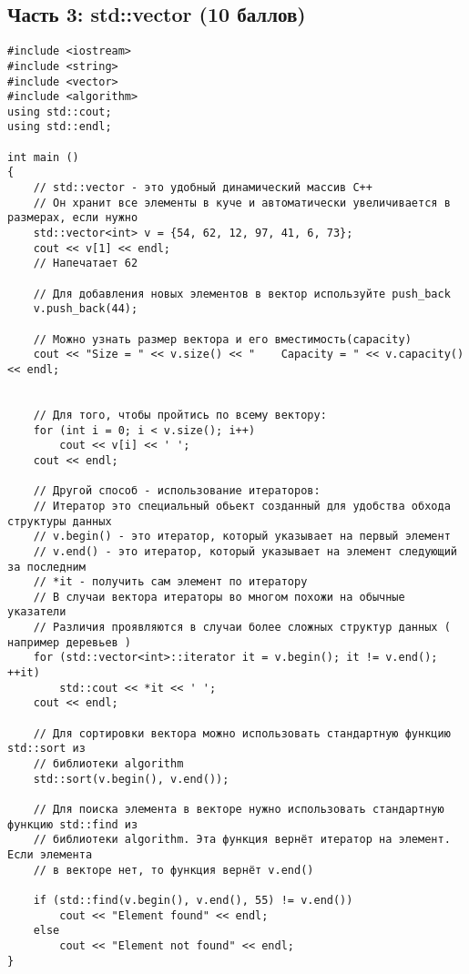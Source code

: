 \documentclass{article}
\begin{document}
\subsection*{Часть 3: std::vector (10 баллов)}
\begin{lstlisting}
#include <iostream>
#include <string>
#include <vector>
#include <algorithm>
using std::cout;
using std::endl;

int main () 
{
    // std::vector - это удобный динамический массив C++
    // Он хранит все элементы в куче и автоматически увеличивается в размерах, если нужно
    std::vector<int> v = {54, 62, 12, 97, 41, 6, 73};
    cout << v[1] << endl;
    // Напечатает 62
    
    // Для добавления новых элементов в вектор используйте push_back   
    v.push_back(44);
    
    // Можно узнать размер вектора и его вместимость(capacity)
    cout << "Size = " << v.size() << "    Capacity = " << v.capacity() << endl;
    
    
    // Для того, чтобы пройтись по всему вектору:
    for (int i = 0; i < v.size(); i++)
    	cout << v[i] << ' ';
    cout << endl;

    // Другой способ - использование итераторов:
    // Итератор это специальный обьект созданный для удобства обхода структуры данных
    // v.begin() - это итератор, который указывает на первый элемент
    // v.end() - это итератор, который указывает на элемент следующий за последним
    // *it - получить сам элемент по итератору
    // В случаи вектора итераторы во многом похожи на обычные указатели
    // Различия проявляются в случаи более сложных структур данных ( например деревьев )
    for (std::vector<int>::iterator it = v.begin(); it != v.end(); ++it)
        std::cout << *it << ' ';
    cout << endl;
    
    // Для сортировки вектора можно использовать стандартную функцию std::sort из
    // библиотеки algorithm
    std::sort(v.begin(), v.end());
    
    // Для поиска элемента в векторе нужно использовать стандартную функцию std::find из
    // библиотеки algorithm. Эта функция вернёт итератор на элемент. Если элемента
    // в векторе нет, то функция вернёт v.end()
    
    if (std::find(v.begin(), v.end(), 55) != v.end())
    	cout << "Element found" << endl;
    else
    	cout << "Element not found" << endl;
}
\end{lstlisting}
\end{document}
